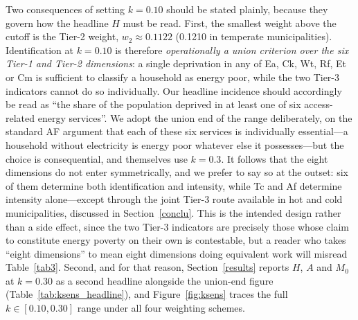 \documentclass[11pt, a4paper]{article}
\begin{document}
Two consequences of setting $k=0.10$ should be stated plainly, because they govern how the headline $H$ must be read. First, the smallest weight above the cutoff is the Tier-2 weight, $w_2 \approx 0.1122$ (0.1210 in temperate municipalities). Identification at $k=0.10$ is therefore \emph{operationally a union criterion over the six Tier-1 and Tier-2 dimensions}: a single deprivation in any of Ea, Ck, Wt, Rf, Et or Cm is sufficient to classify a household as energy poor, while the two Tier-3 indicators cannot do so individually. Our headline incidence should accordingly be read as ``the share of the population deprived in at least one of six access-related energy services''. We adopt the union end of the range deliberately, on the standard AF argument that each of these six services is individually essential---a household without electricity is energy poor whatever else it possesses---but the choice is consequential, and \textcite{nussbaumer2012} themselves use $k=0.3$. It follows that the eight dimensions do not enter symmetrically, and we prefer to say so at the outset: six of them determine both identification and intensity, while Tc and Af determine intensity alone---except through the joint Tier-3 route available in hot and cold municipalities, discussed in Section~\ref{conclu}. This is the intended design rather than a side effect, since the two Tier-3 indicators are precisely those whose claim to constitute energy poverty on their own is contestable, but a reader who takes ``eight dimensions'' to mean eight dimensions doing equivalent work will misread Table~\ref{tab3}. Second, and for that reason, Section~\ref{results} reports $H$, $A$ and $M_0$ at $k=0.30$ as a second headline alongside the union-end figure (Table~\ref{tab:ksens_headline}), and Figure~\ref{fig:ksens} traces the full $k \in [0.10, 0.30]$ range under all four weighting schemes.
\end{document}
